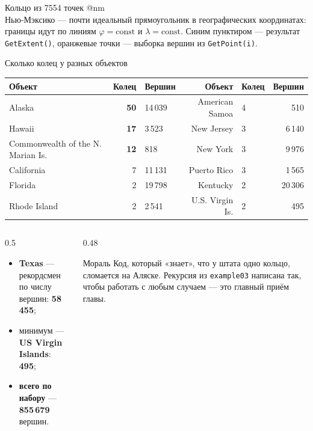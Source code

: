 \documentclass[aspectratio=169,10pt]{beamer}
\makeatletter
\newcommand{\num}[1]{\textcolor{codered}{\textbf{#1}}}
\newcommand{\usePic}[1]{\expandafter\csname pic@#1\endcsname}
\makeatother
\begin{document}
\begin{frame}{Кольцо из 7554 точек}
\centering
\usePic{nm}\\[0.1cm]
\footnotesize
Нью-Мэксико --- почти идеальный прямоугольник в географических
координатах: границы идут по линиям $\varphi=\mathrm{const}$ и
$\lambda=\mathrm{const}$.
Синим пунктиром --- результат \texttt{GetExtent()}, оранжевые точки ---
выборка вершин из \texttt{GetPoint(i)}.
\end{frame}

\begin{frame}{Сколько колец у разных объектов}
\footnotesize
{}
\begin{tabular}{@{}lrlrlr@{}}
  \toprule
  Объект & Колец & Вершин & Объект & Колец & Вершин \\
  \midrule
  Alaska                       & \num{50} & 14\,039 & American Samoa &  4 & 510 \\
  Hawaii                       & \num{17} & 3\,523  & New Jersey     &  3 & 6\,140 \\
  Commonwealth of the N. Marian Is. & \num{12} & 818 & New York  &  3 & 9\,976 \\
  California                   &  7 & 11\,131    & Puerto Rico    &  3 & 1\,565 \\
  Florida                      &  2 & 19\,798    & Kentucky       &  2 & 20\,306 \\
  Rhode Island                 &  2 & 2\,541     & U.S. Virgin Is. & 2 & 495 \\
  \bottomrule
\end{tabular}

\vspace{0.7em}
\begin{columns}[T,onlytextwidth]
  \begin{column}{0.5\textwidth}
    \begin{itemize}\itemsep1pt
      \item \textbf{Texas} --- рекордсмен по числу вершин: \num{58\,455};
      \item минимум --- \textbf{US Virgin Islands}: \num{495};
      \item \textbf{всего по набору} --- \num{855\,679} вершин.
    \end{itemize}
  \end{column}
  \begin{column}{0.48\textwidth}
    \begin{block}{Мораль}\small
      Код, который «знает», что у штата одно кольцо, сломается на Аляске.
      Рекурсия из \texttt{example03} написана так, чтобы работать с любым
      случаем --- это главный приём главы.
    \end{block}
  \end{column}
\end{columns}
\end{frame}
\end{document}
